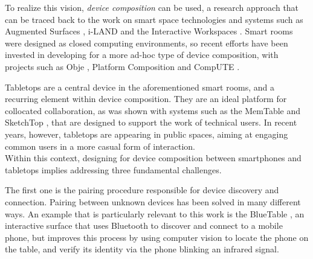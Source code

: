 To realize this vision, \emph{device composition} can be used, a research approach that can be traced back to the work on smart space technologies and systems such as Augmented Surfaces \citep{Rekimoto:1999:augmentedsurfaces}, \mbox{i-LAND} \citep{Streitz:1999:iland} and the Interactive Workspaces \citep{Johanson:2002:iroom}.
Smart rooms were designed as closed computing environments, so recent efforts have been invested in developing for a more ad-hoc type of device composition, with projects such as Obje \citep{Edwards:2009:obje}, Platform Composition \citep{Pering:2009:platformcomp} and CompUTE \citep{Bardram:2010:compute}.

Tabletops are a central device in the aforementioned smart rooms, and a recurring element within device composition.
They are an ideal platform for collocated collaboration, as was shown with systems such as the MemTable \citep{Hunter:2011:memtable} and SketchTop \citep{Clifton:2010:sketchtop}, that are designed to support the work of technical users.
In recent years, however, tabletops are appearing in public spaces, aiming at engaging common users in a more casual form of interaction.
\\
\linebreak
Within this context, designing for device composition between smartphones and tabletops implies addressing three fundamental challenges.

The first one is the pairing procedure responsible for device discovery and connection.
Pairing between unknown devices has been solved in many different ways.
An example that is particularly relevant to this work is the BlueTable \citep{Wilson:2007:bluetable}, an interactive surface that uses Bluetooth to discover and connect to a mobile phone, but improves this process by using computer vision to locate the phone on the table, and verify its identity via the phone blinking an infrared signal.

